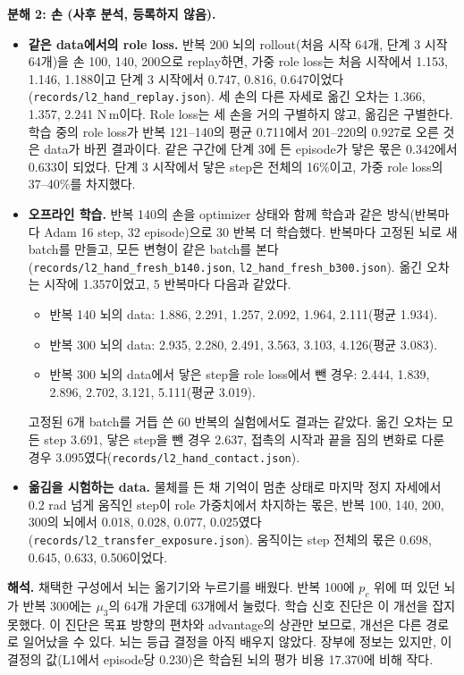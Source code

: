 \documentclass[11pt]{article}\usepackage[margin=1in]{geometry}\usepackage{amsmath,amssymb,amsthm,mathtools}\usepackage{graphicx}\graphicspath{{figures/}{../figures/}{figs/}{./}}\usepackage{enumitem}\usepackage{hyperref}\usepackage{cleveref}\usepackage{tikz}\usetikzlibrary{arrows.meta,positioning,calc,shapes.geometric}\usepackage{float}\usepackage{rotating}\usepackage[most]{tcolorbox}\usepackage{kotex}\usepackage{booktabs}\usepackage{longtable}\emergencystretch=1.6em\tolerance=2000 \crefname{assumption}{Assumption}{Assumptions}\Crefname{assumption}{Assumption}{Assumptions}\crefname{definition}{Definition}{Definitions}\Crefname{definition}{Definition}{Definitions}\crefname{proposition}{Proposition}{Propositions}\Crefname{proposition}{Proposition}{Propositions}\crefname{fact}{Fact}{Facts}\Crefname{fact}{Fact}{Facts} \newtheorem{assumption}{Assumption}\newtheorem{definition}{Definition}\newtheorem{lemma}{Lemma}\newtheorem{proposition}{Proposition}\newtheorem{theorem}{Theorem}\newtheorem{corollary}{Corollary}\newtheorem{fact}{Fact}\theoremstyle{remark}\newtheorem{remark}{Remark} \newcommand{\R}{\mathbb{R}}\newcommand{\xb}{\bar x}\newcommand{\Ab}{\bar A}\newcommand{\By}{\bar B_y}\newcommand{\U}{\mathcal U}\newcommand{\Z}{\mathcal Z}
\begin{document}
\textbf{분해 2: 손 (사후 분석, 등록하지 않음).}
\begin{itemize}
\item \textbf{같은 data에서의 role loss.} 반복 200 뇌의 rollout(처음 시작 64개, 단계 3 시작 64개)을 손 100, 140, 200으로 replay하면, 가중 role loss는 처음 시작에서 1.153, 1.146, 1.188이고 단계 3 시작에서 0.747, 0.816, 0.647이었다(\texttt{records/l2\_hand\_replay.json}). 세 손의 다른 자세로 옮긴 오차는 1.366, 1.357, 2.241 N\,m이다. Role loss는 세 손을 거의 구별하지 않고, 옮김은 구별한다. 학습 중의 role loss가 반복 121--140의 평균 0.711에서 201--220의 0.927로 오른 것은 data가 바뀐 결과이다. 같은 구간에 단계 3에 든 episode가 닿은 몫은 0.342에서 0.633이 되었다. 단계 3 시작에서 닿은 step은 전체의 16\%이고, 가중 role loss의 37--40\%를 차지했다.
\item \textbf{오프라인 학습.} 반복 140의 손을 optimizer 상태와 함께 학습과 같은 방식(반복마다 Adam 16 step, 32 episode)으로 30 반복 더 학습했다. 반복마다 고정된 뇌로 새 batch를 만들고, 모든 변형이 같은 batch를 본다(\texttt{records/l2\_hand\_fresh\_b140.json}, \texttt{l2\_hand\_fresh\_b300.json}). 옮긴 오차는 시작에 1.357이었고, 5 반복마다 다음과 같았다.
\begin{itemize}
\item 반복 140 뇌의 data: 1.886, 2.291, 1.257, 2.092, 1.964, 2.111(평균 1.934).
\item 반복 300 뇌의 data: 2.935, 2.280, 2.491, 3.563, 3.103, 4.126(평균 3.083).
\item 반복 300 뇌의 data에서 닿은 step을 role loss에서 뺀 경우: 2.444, 1.839, 2.896, 2.702, 3.121, 5.111(평균 3.019).
\end{itemize}
고정된 6개 batch를 거듭 쓴 60 반복의 실험에서도 결과는 같았다. 옮긴 오차는 모든 step 3.691, 닿은 step을 뺀 경우 2.637, 접촉의 시작과 끝을 짐의 변화로 다룬 경우 3.095였다(\texttt{records/l2\_hand\_contact.json}).
\item \textbf{옮김을 시험하는 data.} 물체를 든 채 기억이 멈춘 상태로 마지막 정지 자세에서 0.2 rad 넘게 움직인 step이 role 가중치에서 차지하는 몫은, 반복 100, 140, 200, 300의 뇌에서 0.018, 0.028, 0.077, 0.025였다(\texttt{records/l2\_transfer\_exposure.json}). 움직이는 step 전체의 몫은 0.698, 0.645, 0.633, 0.506이었다.
\end{itemize}

\textbf{해석.} 채택한 구성에서 뇌는 옮기기와 누르기를 배웠다. 반복 100에 $p_c$ 위에 떠 있던 뇌가 반복 300에는 $\mu_3$의 64개 가운데 63개에서 눌렀다. 학습 신호 진단은 이 개선을 잡지 못했다. 이 진단은 목표 방향의 편차와 advantage의 상관만 보므로, 개선은 다른 경로로 일어났을 수 있다. 뇌는 등급 결정을 아직 배우지 않았다. 장부에 정보는 있지만, 이 결정의 값(L1에서 episode당 0.230)은 학습된 뇌의 평가 비용 17.370에 비해 작다.
\end{document}
